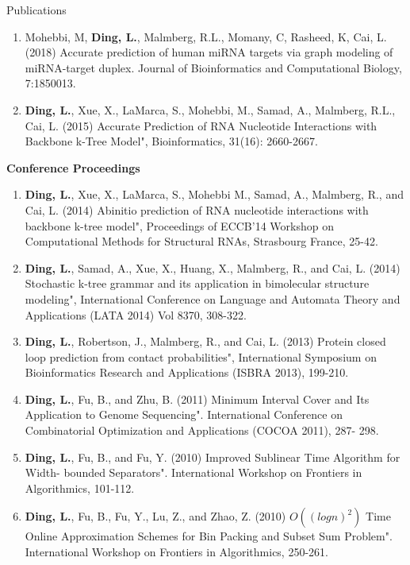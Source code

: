 \documentclass{resume} %
\begin{document}
\begin{rSection}{Publications}
\begin{enumerate}
\item Mohebbi, M, \textbf{Ding, L.}, Malmberg, R.L., Momany, C, Rasheed, K, Cai, L. (2018)
Accurate prediction of human miRNA targets via graph modeling of miRNA-target duplex. Journal of Bioinformatics and Computational Biology, 7:1850013.

\item \textbf{Ding, L.}, Xue, X., LaMarca, S., Mohebbi, M., Samad, A., Malmberg, R.L., Cai, L. (2015) Accurate Prediction of RNA Nucleotide Interactions with Backbone k-Tree Model", Bioinformatics, 31(16): 2660-2667.
\end{enumerate}


\textbf{Conference Proceedings}
\begin{enumerate}
\item \textbf{Ding, L.}, Xue, X., LaMarca, S., Mohebbi M., Samad, A., Malmberg, R., and Cai, L. (2014) Abinitio prediction of RNA nucleotide interactions with backbone k-tree model", Proceedings of ECCB'14 Workshop on Computational Methods for Structural RNAs, Strasbourg France, 25-42.

\item \textbf{Ding, L.}, Samad, A., Xue, X., Huang, X., Malmberg, R., and Cai, L. (2014) Stochastic k-tree grammar and its application in bimolecular structure modeling", International Conference on Language and Automata Theory and Applications (LATA 2014) Vol 8370, 308-322.

\item \textbf{Ding, L.}, Robertson, J., Malmberg, R., and Cai, L. (2013) Protein closed loop prediction from contact probabilities", International Symposium on Bioinformatics Research and Applications (ISBRA 2013), 199-210.

\item \textbf{Ding, L.}, Fu, B., and Zhu, B. (2011) Minimum Interval Cover and Its Application to Genome Sequencing". International Conference on Combinatorial Optimization and Applications (COCOA 2011), 287- 298.

\item \textbf{Ding, L.}, Fu, B., and Fu, Y. (2010) Improved Sublinear Time Algorithm for Width- bounded Separators". International Workshop on Frontiers in Algorithmics, 101-112.

\item \textbf{Ding, L.}, Fu, B., Fu, Y., Lu, Z., and Zhao, Z. (2010) $O((log n)^2)$ Time Online Approximation Schemes for Bin Packing and Subset Sum Problem". International Workshop on Frontiers in Algorithmics, 250-261.
\end{enumerate}



\end{rSection}
\end{document}
